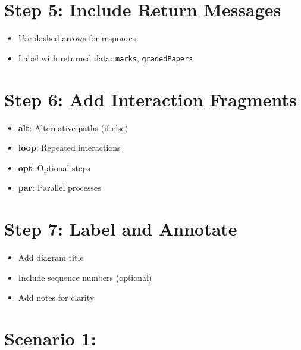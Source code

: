 \section*{Step 5: Include Return Messages}
\begin{itemize}
    \item Use dashed arrows for responses
    \item Label with returned data: \texttt{marks}, \texttt{gradedPapers}
\end{itemize}

\section*{Step 6: Add Interaction Fragments}
\begin{itemize}
    \item \textbf{alt}: Alternative paths (if-else)
    \item \textbf{loop}: Repeated interactions
    \item \textbf{opt}: Optional steps
    \item \textbf{par}: Parallel processes
\end{itemize}

\section*{Step 7: Label and Annotate}
\begin{itemize}
    \item Add diagram title
    \item Include sequence numbers (optional)
    \item Add notes for clarity
\end{itemize}


\section{Scenario 1:}

